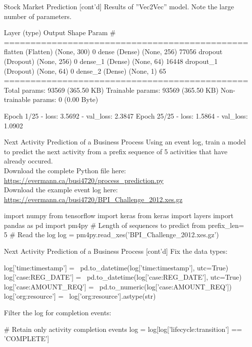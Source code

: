 \documentclass[ignorenonframetext,xcolor=x11names]{beamer}
\begin{document}
\begin{frame}[fragile]{Stock Market Prediction \small [cont'd]}
Results of ''Vec2Vec'' model. Note the large number of parameters.

\begin{textcode}
 Layer (type)          Output Shape    Param #   
==============================================
 flatten (Flatten)     (None, 300)     0         
 dense (Dense)         (None, 256)     77056     
 dropout (Dropout)     (None, 256)     0         
 dense_1 (Dense)       (None, 64)      16448     
 dropout_1 (Dropout)   (None, 64)      0         
 dense_2 (Dense)       (None, 1)       65        
==============================================
Total params: 93569 (365.50 KB)
Trainable params: 93569 (365.50 KB)
Non-trainable params: 0 (0.00 Byte)

Epoch 1/25  - loss: 3.5692 - val_loss: 2.3847
Epoch 25/25 - loss: 1.5864 - val_loss: 1.0902
\end{textcode}
\end{frame}

\begin{frame}[fragile]{Next Activity Prediction of a Business Process}
\small
Using an event log, train a model to predict the next activity from a prefix sequence of 5 activities that have already occured. \\

Download the complete Python file here: \url{https://evermann.ca/busi4720/process_prediction.py} \\
Download the example event log here: \url{https://evermann.ca/busi4720/BPI_Challenge_2012.xes.gz} \\
\begin{pythoncode}
import numpy
from tensorflow import keras
from keras import layers
import pandas as pd
import pm4py
# Length of sequences to predict from
prefix_len= 5
# Read the log
log = pm4py.read_xes('BPI_Challenge_2012.xes.gz')
\end{pythoncode}
\end{frame}

\begin{frame}[fragile]{Next Activity Prediction of a Business Process \small [cont'd]}
Fix the data types:
\begin{pythoncode}
log['time:timestamp'] = \
    pd.to_datetime(log['time:timestamp'], utc=True)
log['case:REG_DATE'] = \
    pd.to_datetime(log['case:REG_DATE'], utc=True)
log['case:AMOUNT_REQ'] = \
    pd.to_numeric(log['case:AMOUNT_REQ'])
log['org:resource'] = \
    log['org:resource'].astype(str)
\end{pythoncode}
Filter the log for completion events:
\begin{pythoncode}
# Retain only activity completion events
log = log[log['lifecycle:transition'] == 'COMPLETE']
\end{pythoncode}
\end{frame}
\end{document}
